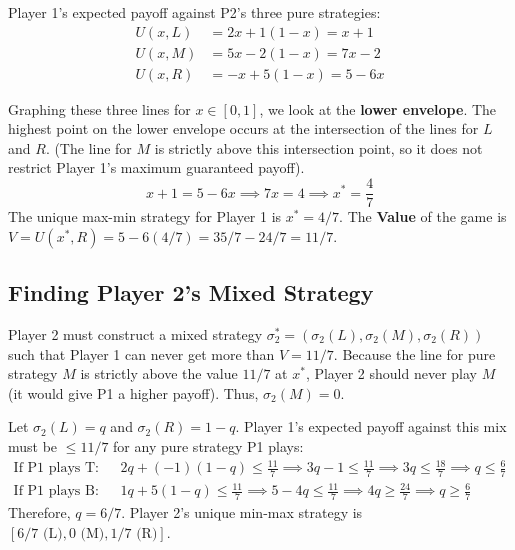 \documentclass[12pt, a4paper]{article}
\begin{document}
Player 1's expected payoff against P2's three pure strategies:
\begin{align*}
  U(x, L) &= 2x + 1(1-x) = x + 1 \\
  U(x, M) &= 5x - 2(1-x) = 7x - 2 \\
  U(x, R) &= -x + 5(1-x) = 5 - 6x
\end{align*}

Graphing these three lines for $x \in [0,1]$, we look at the \textbf{lower envelope}.
The highest point on the lower envelope occurs at the intersection of the lines for $L$ and $R$. (The line for $M$ is strictly above this intersection point, so it does not restrict Player 1's maximum guaranteed payoff).
\[
  x + 1 = 5 - 6x \implies 7x = 4 \implies x^* = \frac{4}{7}
\]
The unique max-min strategy for Player 1 is $x^* = 4/7$.
The \textbf{Value} of the game is $V = U(x^*, R) = 5 - 6(4/7) = 35/7 - 24/7 = 11/7$.

\subsection{Finding Player 2's Mixed Strategy}
Player 2 must construct a mixed strategy $\sigma_2^* = (\sigma_2(L), \sigma_2(M), \sigma_2(R))$ such that Player 1 can never get more than $V = 11/7$.
Because the line for pure strategy $M$ is strictly above the value $11/7$ at $x^*$, Player 2 should never play $M$ (it would give P1 a higher payoff). Thus, $\sigma_2(M) = 0$.

Let $\sigma_2(L) = q$ and $\sigma_2(R) = 1-q$.
Player 1's expected payoff against this mix must be $\leq 11/7$ for any pure strategy P1 plays:
\begin{align*}
  \text{If P1 plays T:} \quad & 2q + (-1)(1-q) \leq \frac{11}{7} \implies 3q - 1 \leq \frac{11}{7} \implies 3q \leq \frac{18}{7} \implies q \leq \frac{6}{7} \\
  \text{If P1 plays B:} \quad & 1q + 5(1-q) \leq \frac{11}{7} \implies 5 - 4q \leq \frac{11}{7} \implies 4q \geq \frac{24}{7} \implies q \geq \frac{6}{7}
\end{align*}
Therefore, $q = 6/7$. Player 2's unique min-max strategy is $[6/7 \text{ (L)}, 0 \text{ (M)}, 1/7 \text{ (R)}]$.
\end{document}
